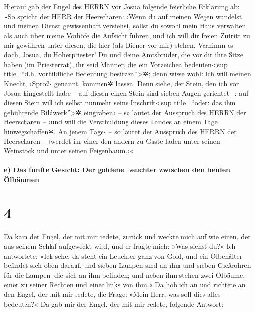  Hierauf gab der Engel des HERRN vor Josua folgende
feierliche Erklärung ab:  »So spricht der HERR der
Heerscharen: ›Wenn du auf meinen Wegen wandelst und meinen Dienst
gewissenhaft versiehst, sollst du sowohl mein Haus verwalten als auch
über meine Vorhöfe die Aufsicht führen, und ich will dir freien Zutritt
zu mir gewähren unter diesen, die hier (als Diener vor mir) stehen.
 Vernimm es doch, Josua, du Hoherpriester! Du und deine
Amtsbrüder, die vor dir ihre Sitze haben (im Priesterrat), ihr seid
Männer, die ein Vorzeichen bedeuten\textless sup title=``d.h.
vorbildliche Bedeutung besitzen''\textgreater✲; denn wisse wohl: Ich
will meinen Knecht, ›Sproß‹ genannt, kommen✲ lassen.  Denn
siehe, der Stein, den ich vor Josua hingestellt habe -- auf diesen einen
Stein sind sieben Augen gerichtet --: auf diesen Stein will ich selbst
nunmehr seine Inschrift\textless sup title=``oder: das ihm gebührende
Bildwerk''\textgreater✲ eingraben‹ -- so lautet der Ausspruch des HERRN
der Heerscharen -- ›und will die Verschuldung dieses Landes an einem
Tage hinwegschaffen✲.  An jenem Tage‹ -- so lautet der
Ausspruch des HERRN der Heerscharen -- ›werdet ihr einer den andern zu
Gaste laden unter seinen Weinstock und unter seinen Feigenbaum.‹«

\hypertarget{e-das-fuxfcnfte-gesicht-der-goldene-leuchter-zwischen-den-beiden-uxf6lbuxe4umen}{%
\paragraph{e) Das fünfte Gesicht: Der goldene Leuchter zwischen den
beiden
Ölbäumen}\label{e-das-fuxfcnfte-gesicht-der-goldene-leuchter-zwischen-den-beiden-uxf6lbuxe4umen}}

\hypertarget{section-3}{%
\section{4}\label{section-3}}

 Da kam der Engel, der mit mir redete, zurück und weckte
mich auf wie einen, der aus seinem Schlaf aufgeweckt wird,
 und er fragte mich: »Was siehst du?« Ich antwortete: »Ich
sehe, da steht ein Leuchter ganz von Gold, und ein Ölbehälter befindet
sich oben darauf, und sieben Lampen sind an ihm und sieben Gießröhren
für die Lampen, die sich an ihm befinden;  und neben ihm
stehen zwei Ölbäume, einer zu seiner Rechten und einer links von ihm.«
 Da hob ich an und richtete an den Engel, der mit mir
redete, die Frage: »Mein Herr, was soll dies alles bedeuten?«
 Da gab mir der Engel, der mit mir redete, folgende
Antwort:

